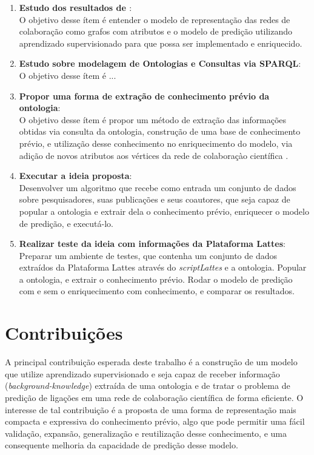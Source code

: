 \begin{enumerate}
    \item \textbf{Estudo dos resultados de \citet{Cervantes2014}}: \\
      O objetivo desse ítem é entender o modelo de representação das redes de colaboração como grafos com atributos e o modelo de predição utilizando aprendizado supervisionado para que possa ser implementado e enriquecido.
    \item \textbf{Estudo sobre modelagem de Ontologias e Consultas via SPARQL}: \\
      O objetivo desse ítem é  ...
    \item \textbf{Propor uma forma de extração de conhecimento prévio da ontologia}: \\
      O objetivo desse ítem é propor um método de extração das informações obtidas via consulta da ontologia, construção de uma base de conhecimento prévio, e utilização desse conhecimento no enriquecimento do modelo, via adição de novos atributos aos vértices da rede de colaboraçào científica .
    \item \textbf{Executar a ideia proposta}: \\
      Desenvolver um algoritmo que recebe como entrada um conjunto de dados sobre pesquisadores, suas publicações e seus coautores, que seja capaz de popular a ontologia e extrair dela o conhecimento prévio, enriquecer o modelo de predição, e executá-lo. %
    \item \textbf{Realizar teste da ideia com informações da Plataforma Lattes}: \\
      Preparar um ambiente de testes, que contenha um conjunto de dados extraídos da Plataforma Lattes através do \textit{scriptLattes} e a ontologia. Popular a ontologia, e extrair o conhecimento prévio. Rodar o modelo de predição com e sem o enriquecimento com conhecimento, e comparar os resultados. %
\end{enumerate}

\section{Contribuições}
\label{sec:contribucoes}

A principal contribuição esperada deste trabalho é a construção de um modelo que utilize aprendizado supervisionado e seja capaz de receber informação (\textit{background-knowledge}) extraída de uma ontologia e de tratar o problema de predição de ligações em uma rede de colaboração científica de forma eficiente.
O interesse de tal contribuição é a proposta de uma forma de representação mais compacta e expressiva do conhecimento prévio, algo que pode permitir uma fácil validação, expansão, generalização e reutilização desse conhecimento, e uma consequente melhoria da capacidade de predição desse modelo.

